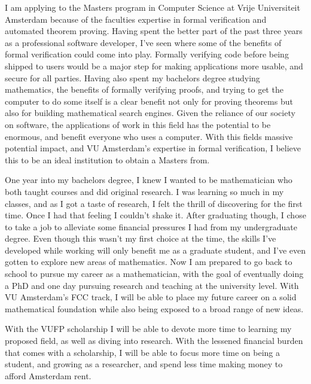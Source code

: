 \documentclass[11pt]{article}
\begin{document}
I am applying to the Masters program in Computer Science at Vrije Universiteit Amsterdam because of the faculties expertise in formal verification and automated theorem proving. Having spent the better part of the past three years as a professional software developer, I've seen where some of the benefits of formal verification could come into play. Formally verifying code before being shipped to users would be a major step for making applications more usable, and secure for all parties. Having also spent my bachelors degree studying mathematics, the benefits of formally verifying proofs, and trying to get the computer to do some itself is a clear benefit not only for proving theorems but also for building mathematical search engines. Given the reliance of our society on software, the applications of work in this field has the potential to be enormous, and benefit everyone who uses a computer. With this fields massive potential impact, and VU Amsterdam's expertise in formal verification, I believe this to be an ideal institution to obtain a Masters from.

One year into my bachelors degree, I knew I wanted to be mathematician who both taught courses and did original research. I was learning so much in my classes, and as I got a taste of research, I felt the thrill of discovering for the first time. Once I had that feeling I couldn't shake it. After graduating though, I chose to take a job to alleviate some financial pressures I had from my undergraduate degree. Even though this wasn't my first choice at the time, the skills I've developed while working will only benefit me as a graduate student, and I've even gotten to explore new areas of mathematics. Now I am prepared to go back to school to pursue my career as a mathematician, with the goal of eventually doing a PhD and one day pursuing research and teaching at the university level. With VU Amsterdam's FCC track, I will be able to place my future career on a solid mathematical foundation while also being exposed to a broad range of new ideas.

With the VUFP scholarship I will be able to devote more time to learning my proposed field, as well as diving into research. With the lessened financial burden that comes with a scholarship, I will be able to focus more time on being a student, and growing as a researcher, and spend less time making money to afford Amsterdam rent.
\end{document}
